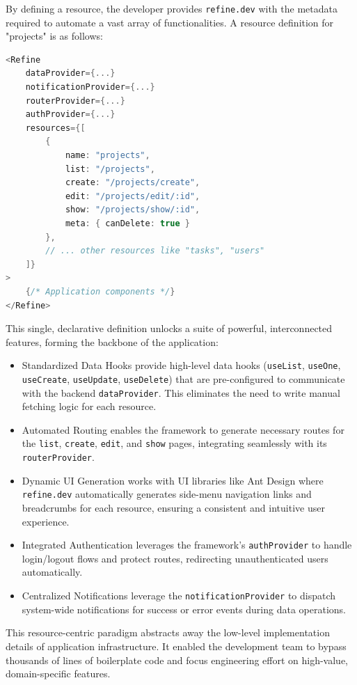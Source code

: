By defining a resource, the developer provides \texttt{refine.dev} with the metadata required to automate a vast array of functionalities. A resource definition for "projects" is as follows:
\begin{lstlisting}[language=c]
<Refine
    dataProvider={...}
    notificationProvider={...}
    routerProvider={...}
    authProvider={...}
    resources={[
        {
            name: "projects",
            list: "/projects",
            create: "/projects/create",
            edit: "/projects/edit/:id",
            show: "/projects/show/:id",
            meta: { canDelete: true }
        },
        // ... other resources like "tasks", "users"
    ]}
>
    {/* Application components */}
</Refine>
\end{lstlisting}
This single, declarative definition unlocks a suite of powerful, interconnected features, forming the backbone of the application:
\begin{itemize}
    \item Standardized Data Hooks provide high-level data hooks (\texttt{useList}, \texttt{useOne}, \texttt{useCreate}, \texttt{useUpdate}, \texttt{useDelete}) that are pre-configured to communicate with the backend \texttt{dataProvider}. This eliminates the need to write manual fetching logic for each resource.
    \item Automated Routing enables the framework to generate necessary routes for the \texttt{list}, \texttt{create}, \texttt{edit}, and \texttt{show} pages, integrating seamlessly with its \texttt{routerProvider}.
    \item Dynamic UI Generation works with UI libraries like Ant Design where \texttt{refine.dev} automatically generates side-menu navigation links and breadcrumbs for each resource, ensuring a consistent and intuitive user experience.
    \item Integrated Authentication leverages the framework's \texttt{authProvider} to handle login/logout flows and protect routes, redirecting unauthenticated users automatically.
    \item Centralized Notifications leverage the \texttt{notificationProvider} to dispatch system-wide notifications for success or error events during data operations.
\end{itemize}

This resource-centric paradigm abstracts away the low-level implementation details of application infrastructure. It enabled the development team to bypass thousands of lines of boilerplate code and focus engineering effort on high-value, domain-specific features.

